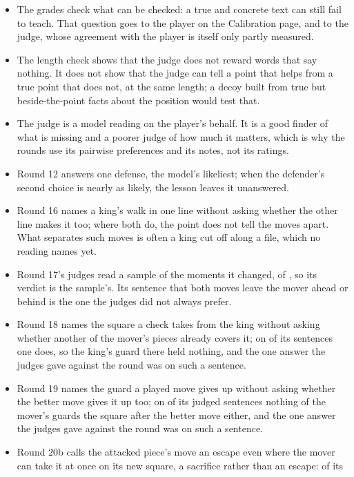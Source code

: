 \documentclass[11pt]{article}
\begin{document}
\begin{itemize}[nosep]
\item The grades check what can be checked: a true and concrete text can still fail to teach.
That question goes to the player on the Calibration page, and to the judge, whose agreement with
the player is itself only partly measured.
\item The length check shows that the judge does not reward words that say nothing. It does not
show that the judge can tell a point that helps from a true point that does not, at the same
length; a decoy built from true but beside-the-point facts about the position would test that.
\item The judge is a model reading on the player's behalf. It is a good finder of what is
missing and a poorer judge of how much it matters, which is why the rounds use its pairwise
preferences and its notes, not its ratings.
\item Round 12 answers one defense, the model's likeliest; when the defender's second choice is
nearly as likely, the lesson leaves it unanswered.
\item Round 16 names a king's walk in one line without asking whether the other line makes it too;
where both do, the point does not tell the moves apart. What separates such moves is often a king
cut off along a file, which no reading names yet.
\item Round 17's judges read a sample of the moments it changed, \RoundSeventeenSampled{} of
\RoundSeventeenChanged, so its verdict is the sample's. Its sentence that both moves leave the mover
ahead or behind is the one the judges did not always prefer.
\item Round 18 names the square a check takes from the king without asking whether another of the
mover's pieces already covers it; on \RoundEighteenHeldNothing{} of its sentences one does, so the
king's guard there held nothing, and the one answer the judges gave against the round was on such
a sentence.
\item Round 19 names the guard a played move gives up without asking whether the better move gives
it up too; on \RoundNineteenBothLeave{} of its \RoundNineteenJudged{} judged sentences nothing of
the mover's guards the square after the better move either, and the one answer the judges gave
against the round was on such a sentence.
\item Round 20b calls the attacked piece's move an escape even where the mover can take it at once
on its new square, a sacrifice rather than an escape: \RoundTwentyHangs{} of its

\end{itemize}
\end{document}

